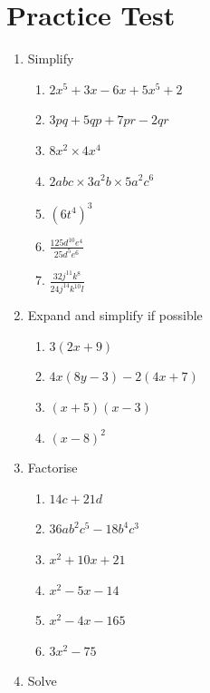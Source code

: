 \documentclass[a4paper,12pt]{article}
\begin{document}
\section{Practice Test}
\begin{enumerate}
	\item  Simplify
\begin{multicols}{2}
	\begin{enumerate}[label=\normalsize \alph*)~~~, itemsep=0.4cm]
		\item $ 2x^5 + 3x - 6x + 5x^5 + 2$ 
		\item $3pq + 5qp + 7pr - 2qr$ 
		\item $8x^2 \times 4x^4$ 
		\item $2abc \times 3a^2b \times 5a^2c^6$ 
		\item $ \left( 6t^4 \right)^3$ 
		\item $\displaystyle \frac{ 125 d^{10} e^4}{ 25 d^5 e^6}$
		\item $\displaystyle \frac{ 32 j^{11} k^8}{ 24 j^{14} k^{10} l}$
	\end{enumerate}
\end{multicols}
\item Expand and simplify if possible
\begin{multicols}{2}
	\begin{enumerate}[label=\normalsize \alph*)~~~,  itemsep=0.4cm]
		\item $3(2x +9)$ 
		\item $4x(8y-3) - 2(4x+7)$ 
		\item $(x+5)(x-3)$ 
		\item $(x-8)^2$ 
	\end{enumerate}
\end{multicols}
\item Factorise
\begin{multicols}{2}
	\begin{enumerate}[label=\normalsize \alph*)~~~,  itemsep=0.4cm]
		\item $14c + 21d$ 
		\item $36ab^2c^5 - 18b^4c^3$ 
		\item $x^2 + 10x +21$ 
		\item $x^2 - 5x -14$ 
		\item $x^2 - 4x-165$ 
		\item $3x^2 - 75$ 
	\end{enumerate}
\end{multicols}
\item Solve
\begin{multicols}{2}

\end{multicols}
\end{enumerate}
\end{document}
